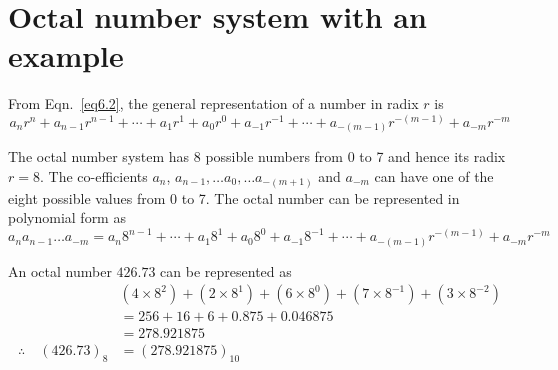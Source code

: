 
\eject

\section{Octal number system with an example}\label{sec6.5}

From Eqn.~\eqref{eq6.2}, the general representation of a number in radix $r$ is
$$
a_{n}r^{n}+a_{n-1}r^{n-1}+\cdots+a_{1}r^{1}+a_{0}r^{0}+a_{-1}r^{-1}+\cdots+a_{-(m-1)}r^{-(m-1)}+a_{-m}r^{-m}
$$

The octal number system has 8 possible numbers from 0 to 7 and hence its radix $r=8$. The co-efficients $a_{n}$, $a_{n-1},\ldots a_{0},\ldots a_{-(m+1)}$ and $a_{-m}$ can have one of the eight possible values from 0 to 7. The octal number can be represented in polynomial form as
\begin{equation}
a_{n}a_{n-1}\ldots a_{-m}=a_{n}8^{n-1}+\cdots+a_{1}8^{1}+a_{0}8^{0}+a_{-1}8^{-1}+\cdots+a_{-(m-1)}r^{-(m-1)}+a_{-m}r^{-m}\label{eq6.4}
\end{equation}

An octal number $426.73$ can be represented as
\begin{align*}
& (4\times 8^{2})+(2\times 8^{1})+(6\times 8^{0})+(7\times 8^{-1})+(3\times 8^{-2})\\[3pt]
&= 256+16+6+0.875+0.046875\\[3pt]
&= 278.921875\\[3pt]
\therefore\quad (426.73)_{8} &= (278.921875)_{10}
\end{align*}

